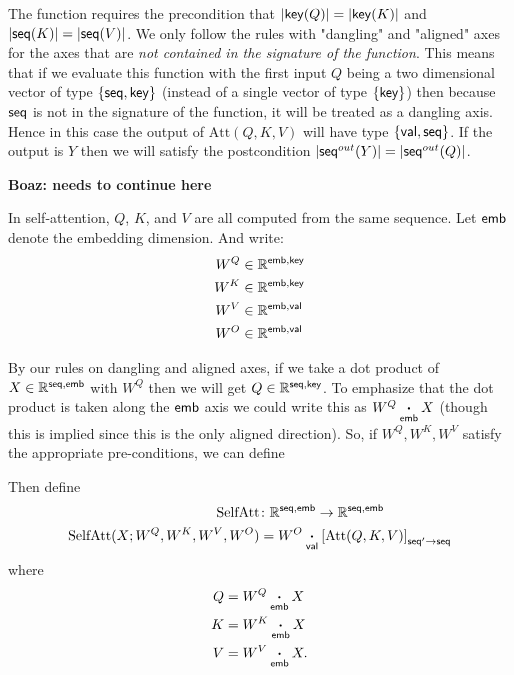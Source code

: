 \documentclass{article}
\begin{document}
The function requires the precondition that $|\name{key}(Q)|=|\name{key}(K)|$ and $|\name{seq}(K)|=|\name{seq}(V)|$.
We only follow the rules with "dangling" and "aligned" axes for the axes that are \emph{not contained in the signature of the function}.
This means that if we evaluate this function with the first input $Q$ being  a two dimensional vector of type $\{ \name{seq} , \name{key} \}$ (instead of a single vector of type $\{ \name{key} \}$) then because $\name{seq}$ is not in the signature of the function,
it will be treated as a dangling axis. Hence in this case the output of $\text{Att}(Q,K,V)$ will have type $\{ \name{val} ,\name{seq} \}$. 
If the output is $Y$ then we will satisfy the postcondition  $|\name{seq}^{out}(Y)|=|\name{seq}^{out}(Q)|$.



\textbf{Boaz: needs to continue here} 


In self-attention, $Q$, $K$, and $V$ are all computed from the same sequence.  
Let $\name{emb}$ denote the embedding dimension.
And write:
\begin{align*}
  W^Q &\in \mathbb{R}^{\name{emb}, \name{key}} \\
  W^K &\in \mathbb{R}^{\name{emb}, \name{key}} \\
  W^V &\in \mathbb{R}^{\name{emb}, \name{val}} \\
  W^O &\in \mathbb{R}^{\name{emb}, \name{val}}
\end{align*}

By our rules on dangling and aligned axes, if we take a dot product of $X \in \mathbb{R}^{\name{seq},\name{emb}}$ with $W^Q$ then we will get 
$Q \in \mathbb{R}^{\name{seq},\name{key}}$. 
To emphasize that the dot product is taken along the $\name{emb}$ axis  we could write this as $W^Q \ndot{emb} X$ (though this is implied since this is the only aligned direction).
So, if $W^Q,W^K,W^V$ satisfy the appropriate pre-conditions, we can define 


Then define
\begin{align*}
  \text{SelfAtt} &\colon \mathbb{R}^{\name{seq},\name{emb}} \rightarrow \mathbb{R}^{\name{seq},\name{emb}} \\
  \text{SelfAtt}(X; W^Q, W^K, W^V, W^O) &= W^O \ndot{val} \nmov{seq'}{seq}{\text{Att}(Q, K, V)}
\end{align*}
where
\begin{align*}
  Q &= W^Q \ndot{emb} X \\
  K &= W^K \ndot{emb} X \\
  V &= W^V \ndot{emb} X.
\end{align*}
\end{document}
